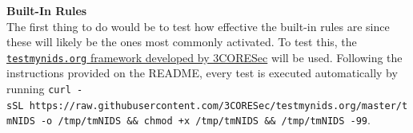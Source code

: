 \documentclass[titlepage]{article}
\begin{document}
        \bigskip

        \textbf{Built-In Rules} \\
        The first thing to do would be to test how effective the built-in rules
        are since these will likely be the ones most commonly activated. To test
        this, the
        \href{https://github.com/3CORESec/testmynids.org}{\texttt{testmynids.org}
        framework developed by 3CORESec} will be used. Following the
        instructions provided on the README, every test is executed
        automatically by running
        \texttt{curl\ -sSL\ https://raw.githubusercontent.com/3CORESec/testmynids.org/master/tmNIDS\ -o\ /tmp/tmNIDS\ \&\&\ chmod\ +x\ /tmp/tmNIDS\ \&\&\ /tmp/tmNIDS\ -99}.

        \vspace{0.5em}
\end{document}
